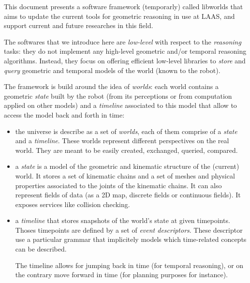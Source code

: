 \documentclass[a4paper]{article}
\begin{document}
This document presents a software framework (temporarly) called libworlds that
aims to update the current tools for geometric reasoning in use at
LAAS, and support current and future researches in this field.

The softwares that we introduce here are \emph{low-level} with respect
to the \emph{reasoning} tasks: they do not implement any high-level
geometric and/or temporal reasoning algorithms. Instead, they
focus on offering efficient low-level libraries to \emph{store} and
\emph{query} geometric and temporal models of the world (known to the
robot).

The framework is build around the idea of \emph{worlds}: each world
contains a geometric \emph{state} built by the robot (from its
perceptions or from computation applied on other models) and a
\emph{timeline} associated to this model that allow to access the model
back and forth in time:

\begin{itemize}

 \item the universe is describe as a set of \emph{worlds}, each of them comprise of a \emph{state} and 
 a \emph{timeline}. These worlds represent different perspectives 
 on the real world. They are meant to be easily created, exchanged, queried, compared.
   
 \item a \emph{state} is a model of the geometric and kinematic structure of the (current) world.
 It stores a set of kinematic chains and a set of meshes and physical properties associated to the joints
 of the kinematic chains. It can also represent fields of data (as a 2D map, discrete fields or continuous fields).
 It exposes services like collision checking.

 \item a \emph{timeline} that stores snapshots of the world's state at given timepoints. Thoses timepoints
 are defined by a set of \emph{event descriptors}. These descriptor use a particular grammar that implicitely 
 models which time-related concepts can be described.

 The timeline allows for jumping back in time (for temporal reasoning), or on the contrary move forward in time 
 (for planning purposes for instance).

\end{itemize}

\end{document}

